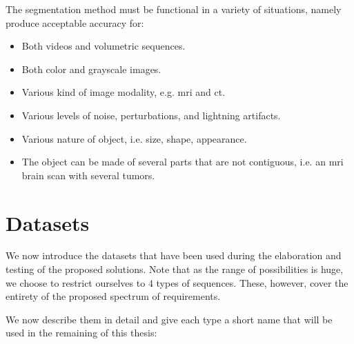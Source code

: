 The segmentation method must be functional in a variety of situations, namely produce acceptable accuracy for:
\begin{itemize}
  \item Both videos and volumetric sequences.
  \item Both color and grayscale images.
  \item Various kind of image modality, e.g. \gls{mri} and \gls{ct}.
  \item Various levels of noise, perturbations, and lightning artifacts.
  \item Various nature of object, i.e. size, shape, appearance.
  \item The object can be made of several parts that are not contiguous, i.e. an \gls{mri} brain scan with several tumors.
\end{itemize}


\section{Datasets}

We now introduce the datasets that have been used during the elaboration and testing of the proposed solutions.
Note that as the range of possibilities is huge, we choose to restrict ourselves to $4$ types of sequences.
These, however, cover the entirety of the proposed spectrum of requirements.

We now describe them in detail and give each type a short name that will be used in the remaining of this thesis:

